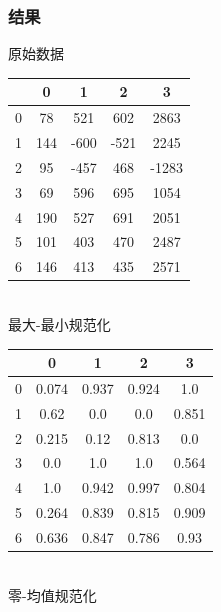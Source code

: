 \documentclass{article}
\begin{document}
        \subsubsection{结果}
            原始数据\\
            \begin{table}[htbp]
                \centering
                \begin{tabular}{c c c c c}\\\toprule
                  & 0   & 1    & 2    & 3     \\\hline
                0 & 78  & 521  & 602  & 2863  \\
                1 & 144 & -600 & -521 & 2245  \\
                2 & 95  & -457 & 468  & -1283 \\
                3 & 69  & 596  & 695  & 1054  \\
                4 & 190 & 527  & 691  & 2051  \\
                5 & 101 & 403  & 470  & 2487  \\
                6 & 146 & 413  & 435  & 2571 \\\bottomrule
                \end{tabular}
            \end{table}
            \\最大-最小规范化\\
            \begin{table}[htbp]
                \centering
                \begin{tabular}{ c  c  c  c c}\toprule
                  & 0 & 1 & 2 & 3\\\hline
                0 & 0.074 & 0.937 & 0.924 & 1.0\\
                1 & 0.62 & 0.0 & 0.0 & 0.851\\
                2 & 0.215 & 0.12 & 0.813 & 0.0\\
                3 & 0.0 & 1.0 & 1.0 & 0.564\\
                4 & 1.0 & 0.942 & 0.997 & 0.804\\
                5 & 0.264 & 0.839 & 0.815 & 0.909\\
                6 & 0.636 & 0.847 & 0.786 & 0.93\\
                \bottomrule
                \end{tabular}
            \end{table}                   
            \\零-均值规范化\\
\end{document}
